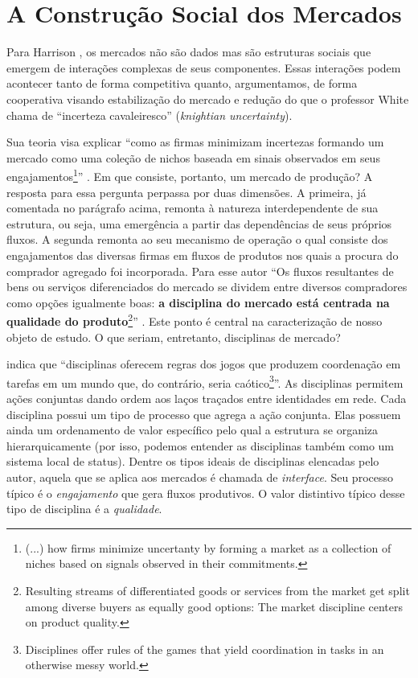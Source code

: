 \documentclass[a4paper, 12pt, openright, oneside, german, french, english, brazil]{abntex2}
\begin{document}
	\chapter{A Construção Social dos Mercados}
	
	Para Harrison , os mercados não são dados mas são estruturas sociais que emergem de interações complexas de seus componentes. Essas interações podem acontecer tanto de forma competitiva quanto, argumentamos, de forma cooperativa visando estabilização do mercado e redução do que o professor White chama de ``incerteza cavaleiresco'' (\textit{knightian uncertainty}).
	
	Sua teoria visa explicar ``como as firmas minimizam incertezas formando um mercado como uma coleção de nichos baseada em sinais observados em seus engajamentos\footnote{(...) how firms minimize uncertanty by forming a market as a collection of niches based on signals observed in their commitments.}'' \cite[p. xiii]{white2002markets}. Em que consiste, portanto, um mercado de produção? A resposta para essa pergunta perpassa por duas dimensões. A primeira, já comentada no parágrafo acima, remonta à natureza interdependente de sua estrutura, ou seja, uma emergência a partir das dependências de seus próprios fluxos. A segunda remonta ao seu mecanismo de operação o qual consiste dos engajamentos das diversas firmas em fluxos de produtos nos quais a procura do comprador agregado foi incorporada. Para esse autor ``Os fluxos resultantes de bens ou serviços diferenciados do mercado se dividem entre diversos compradores como opções igualmente boas: \textbf{a disciplina do mercado está centrada na qualidade do produto}\footnote{Resulting streams of differentiated goods or services from the market get split among diverse buyers as equally good options: The market discipline centers on product quality.}'' \cite[p. 1, grifo meu]{white2002markets}. Este ponto é central na caracterização de nosso objeto de estudo. O que seriam, entretanto, disciplinas de mercado?
	
	 indica que ``disciplinas oferecem regras dos jogos que produzem coordenação em tarefas em um mundo que, do contrário, seria caótico\footnote{Disciplines offer rules of the games that yield coordination in tasks in an otherwise messy world.}''. As disciplinas permitem ações conjuntas dando ordem aos laços traçados entre identidades em rede. Cada disciplina possui um tipo de processo que agrega a ação conjunta. Elas possuem ainda um ordenamento de valor específico pelo qual a estrutura se organiza hierarquicamente (por isso, podemos entender as disciplinas também como um sistema local de status). Dentre os tipos ideais de disciplinas elencadas pelo autor, aquela que se aplica aos mercados é chamada de \textit{interface}. Seu processo típico é o \textit{engajamento} que gera fluxos produtivos. O valor distintivo típico desse tipo de disciplina é a \textit{qualidade}.
	
\end{document}
